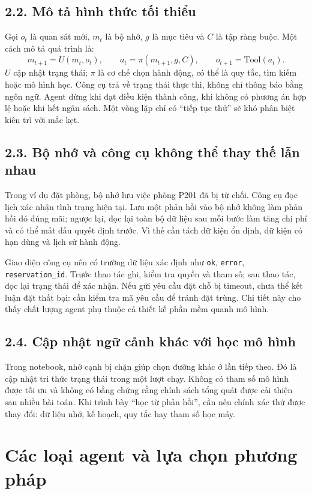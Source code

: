 \documentclass[11pt,a4paper]{article}
\begin{document}
\subsection{2.2. Mô tả hình thức tối thiểu}
Gọi $o_t$ là quan sát mới, $m_t$ là bộ nhớ, $g$ là mục tiêu và $C$ là tập ràng buộc.
Một cách mô tả quá trình là:
\[
m_{t+1}=U(m_t,o_t),\qquad a_t=\pi(m_{t+1},g,C),\qquad
o_{t+1}=\mathrm{Tool}(a_t).
\]
$U$ cập nhật trạng thái; $\pi$ là cơ chế chọn hành động, có thể là quy tắc, tìm kiếm
hoặc mô hình học. Công cụ trả về trạng thái thực thi, không chỉ thông báo bằng ngôn ngữ.
Agent dừng khi đạt điều kiện thành công, khi không có phương án hợp lệ hoặc khi hết
ngân sách. Một vòng lặp chỉ có ``tiếp tục thử'' sẽ khó phân biệt kiên trì với mắc kẹt.

\subsection{2.3. Bộ nhớ và công cụ không thể thay thế lẫn nhau}
Trong ví dụ đặt phòng, bộ nhớ lưu việc phòng P201 đã bị từ chối. Công cụ đọc lịch xác
nhận tình trạng hiện tại. Lưu một phản hồi vào bộ nhớ không làm phản hồi đó đúng mãi;
ngược lại, đọc lại toàn bộ dữ liệu sau mỗi bước làm tăng chi phí và có thể mất dấu quyết
định trước. Vì thế cần tách dữ kiện ổn định, dữ kiện có hạn dùng và lịch sử hành động.

Giao diện công cụ nên có trường dữ liệu xác định như \texttt{ok}, \texttt{error},
\texttt{reservation\_id}. Trước thao tác ghi, kiểm tra quyền và tham số; sau thao tác,
đọc lại trạng thái để xác nhận. Nếu gửi yêu cầu đặt chỗ bị timeout, chưa thể kết luận
đặt thất bại: cần kiểm tra mã yêu cầu để tránh đặt trùng. Chi tiết này cho thấy chất
lượng agent phụ thuộc cả thiết kế phần mềm quanh mô hình.

\subsection{2.4. Cập nhật ngữ cảnh khác với học mô hình}
Trong notebook, nhớ cạnh bị chặn giúp chọn đường khác ở lần tiếp theo. Đó là cập nhật
tri thức trạng thái trong một lượt chạy. Không có tham số mô hình được tối ưu và không
có bằng chứng rằng chính sách tổng quát được cải thiện sau nhiều bài toán. Khi trình bày
``học từ phản hồi'', cần nêu chính xác thứ được thay đổi: dữ liệu nhớ, kế hoạch, quy tắc
hay tham số học máy.

\newpage
\section{Các loại agent và lựa chọn phương pháp}
\end{document}
